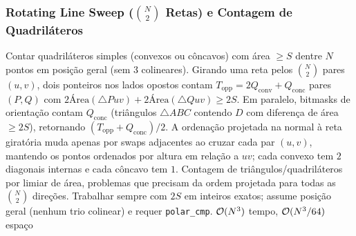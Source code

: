 \subsubsection{Rotating Line Sweep ($\binom{N}{2}$ Retas) e Contagem de Quadriláteros}
\algobox
  {Contar quadriláteros simples (convexos ou côncavos) com área $\ge S$ dentre $N$ pontos em posição geral (sem 3 colineares).}
  {Girando uma reta pelos $\binom{N}{2}$ pares $(u, v)$, dois ponteiros nos lados opostos contam $T_{\text{opp}} = 2Q_{\text{conv}} + Q_{\text{conc}}$ pares $(P, Q)$ com $2\text{Área}(\triangle Puv) + 2\text{Área}(\triangle Quv) \ge 2S$. Em paralelo, bitmasks de orientação contam $Q_{\text{conc}}$ (triângulos $\triangle ABC$ contendo $D$ com diferença de área $\ge 2S$), retornando $(T_{\text{opp}} + Q_{\text{conc}}) / 2$.}
  {A ordenação projetada na normal à reta giratória muda apenas por swaps adjacentes ao cruzar cada par $(u, v)$, mantendo os pontos ordenados por altura em relação a $uv$; cada convexo tem $2$ diagonais internas e cada côncavo tem $1$.}
  {Contagem de triângulos/quadriláteros por limiar de área, problemas que precisam da ordem projetada para todas as $\binom{N}{2}$ direções.}
  {Trabalhar sempre com $2S$ em inteiros exatos; assume posição geral (nenhum trio colinear) e requer \texttt{polar\_cmp}.}
  {$\mathcal{O}(N^3)$ tempo, $\mathcal{O}(N^3 / 64)$ espaço}

